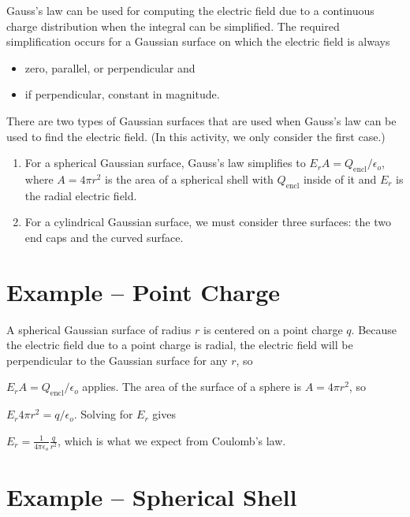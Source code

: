 \documentclass{article}
\newcommand{\ds}[0]{\displaystyle}
\begin{document}
Gauss's law can be used for computing the electric field due to a continuous charge distribution when the integral can be simplified. The required simplification occurs for a Gaussian surface on which the electric field is always

\begin{itemize}

  \item zero, parallel, or perpendicular and

  \item if perpendicular, constant in magnitude.

\end{itemize}

There are two types of Gaussian surfaces that are used when Gauss's law can be used to find the electric field. (In this activity, we only consider the first case.)

\begin{enumerate}

  \item For a spherical Gaussian surface, Gauss's law simplifies to $\ds E_rA = {Q_{\text{encl}}}/{\epsilon_o}$, where $A=4\pi r^2$ is the area of a spherical shell with $Q_{\text{encl}}$ inside of it and $E_r$ is the radial electric field.

  \item For a cylindrical Gaussian surface, we must consider three surfaces: the two end caps and the curved surface.

\end{enumerate}


\section{Example -- Point Charge}

A spherical Gaussian surface of radius $r$ is centered on a point charge $q$. Because the electric field due to a point charge is radial, the electric field will be perpendicular to the Gaussian surface for any $r$, so

$\ds E_rA = {Q_{\text{encl}}}/{\epsilon_o}$ applies. The area of the surface of a sphere is $A = 4\pi r^2$, so

$\ds E_r 4\pi r^2 = {q}/{\epsilon_o}$. Solving for $E_r$ gives

$\ds E_r = \frac{1}{4\pi\epsilon_o}\frac{q}{r^2}$, which is what we expect from Coulomb's law.

\section{Example -- Spherical Shell}
\end{document}
